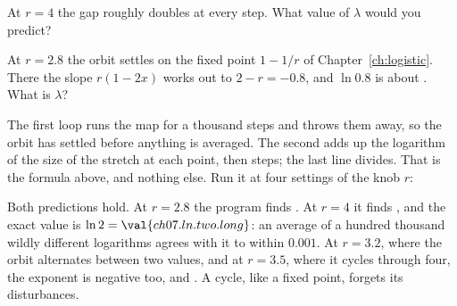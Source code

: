 \begin{think}
At $r = 4$ the gap roughly doubles at every step. What value of $\lambda$
would you predict?
\end{think}

\begin{think}
At $r = \num{2.8}$ the orbit settles on the fixed point $1 - 1/r$ of
Chapter~\ref{ch:logistic}. There the slope $r(1 - 2x)$ works out to
$2 - r = -\num{0.8}$, and $\ln\num{0.8}$ is about .
What is $\lambda$?
\end{think}


\noindent
The first loop runs the map for a thousand steps and throws them away, so
the orbit has settled before anything is averaged. The second adds up the
logarithm of the size of the stretch at each point, then steps; the last line
divides. That is the formula above, and nothing else. Run it at four settings
of the knob $r$:



\noindent
Both predictions hold. At $r = \num{2.8}$ the program finds
. At $r = 4$ it finds , and the
exact value is $\ln 2 = \val{ch07.ln.two.long}$: an average of a hundred
thousand wildly different logarithms agrees with it to within $\num{0.001}$.
At $r = \num{3.2}$, where
the orbit alternates between two values, and at $r = \num{3.5}$, where it
cycles through four, the exponent is negative too, 
and . A cycle, like a fixed point, forgets its
disturbances.



